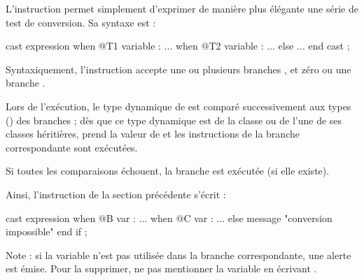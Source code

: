 L'instruction  permet simplement d'exprimer de manière plus élégante une série de test de conversion. Sa syntaxe est :

\begin{galgascode}
cast expression
when @T1 variable :
  ...
when @T2 variable :
  ...
else
  ...
end cast ;
\end{galgascode}

Syntaxiquement, l'instruction accepte une ou plusieurs branches , et zéro ou une branche .

Lors de l'exécution, le type dynamique de  est comparé successivement aux types () des branches  ; dès que ce type dynamique est de la classe  ou de l'une de ses classes héritières,  prend la valeur de  et les instructions de la branche correspondante sont exécutées.

Si toutes les comparaisons échouent, la branche  est exécutée (si elle existe).


Ainsi, l'instruction  de la section précédente s'écrit :


\begin{galgascode}
cast expression
when @B var :
  ...
when @C var :
  ...
else
  message "conversion impossible"
end if ;
\end{galgascode}

Note : si la variable  n'est pas utilisée dans la branche correspondante, une alerte est émise. Pour la supprimer, ne pas mentionner la variable en écrivant .


